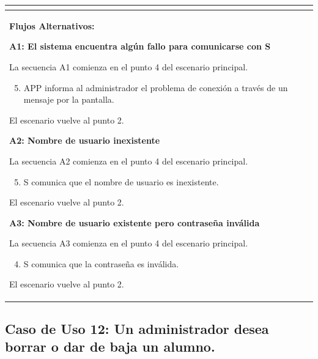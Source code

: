 \begin{longtable}{|l|p{5.5cm}|l|p{2cm}|l|p{1.9cm}|}
{    } \\ \hline

    \multicolumn{6}{|p{15cm}|}{ \textbf{Flujos Alternativos: }

    \textbf{A1: El sistema encuentra algún fallo para comunicarse con S}
    
    La secuencia A1 comienza en el punto 4 del escenario principal.
    \begin{enumerate}
        \setcounter{enumi}{4}
        \item APP informa al administrador el problema de conexión a través de un mensaje por la pantalla.
    \end{enumerate}

    El escenario vuelve al punto 2.

    \textbf{A2: Nombre de usuario inexistente}
    
    La secuencia A2 comienza en el punto 4 del escenario principal.
    \begin{enumerate}
        \setcounter{enumi}{4}
        \item S comunica que el nombre de usuario es inexistente.
    \end{enumerate}

    El escenario vuelve al punto 2.

    \textbf{A3: Nombre de usuario existente pero contraseña inválida}
    
    La secuencia A3 comienza en el punto 4 del escenario principal.
    \begin{enumerate}
        \setcounter{enumi}{3}
        \item S comunica que la contraseña es inválida.
    \end{enumerate}

    El escenario vuelve al punto 2.

    } \\ \hline

\end{longtable}


\subsection{Caso de Uso 12: Un administrador desea borrar o dar de baja un alumno.}

